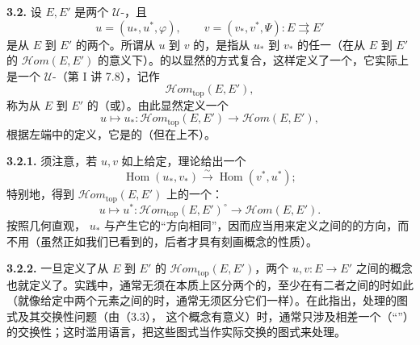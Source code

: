 \textbf{3.2.} 设 $E,E'$ 是两个 $\mathcal U$-，且
\[
 u=(u_*,u^*,\varphi),\qquad v=(v_*,v^*,\Psi):E\rightrightarrows E'
\]
是从 $E$ 到 $E'$ 的两个。所谓从 $u$ 到 $v$ 的，是指从 $u_*$ 到 $v_*$ 的任一（在从 $E$ 到 $E'$ 的 $\mathscr Hom(E,E')$ 的意义下）。的以显然的方式复合，这样定义了一个，它实际上是一个 $\mathcal U$-（第 I 讲 7.8），记作
\[
 \mathscr Hom_{\mathrm{top}}(E,E'),
\]
称为从 $E$ 到 $E'$ 的（或）。由此显然定义一个
\[
 u\longmapsto u_*:\mathscr Hom_{\mathrm{top}}(E,E')\longrightarrow\mathscr Hom(E,E'),
\]
根据左端中的定义，它是的（但在上不）。

\textbf{3.2.1.} 须注意，若 $u,v$ 如上给定，理论给出一个
\[
 \operatorname{Hom}(u_*,v_*)\xrightarrow{\sim}\operatorname{Hom}(v^*,u^*);
\]
特别地，得到 $\mathscr Hom_{\mathrm{top}}(E,E')$ 上的一个：
\[
 u\longmapsto u^*:\mathscr Hom_{\mathrm{top}}(E,E')^\circ\longrightarrow\mathscr Hom(E,E').
\]
按照几何直观， $u_*$ 与产生它的“方向相同”，因而应当用来定义之间的的方向，而不用（虽然正如我们已看到的，后者才具有刻画概念的性质）。

\textbf{3.2.2.} 一旦定义了从 $E$ 到 $E'$ 的 $\mathscr Hom_{\mathrm{top}}(E,E')$，两个 $u,v:E\to E'$ 之间的概念也就定义了。实践中，通常无须在本质上区分两个的，至少在有二者之间的时如此（就像给定中两个元素之间的时，通常无须区分它们一样）。在此指出，处理的图式及其交换性问题（由（3.3），
这个概念有意义）时，通常只涉及相差一个（“”）的交换性；这时滥用语言，把这些图式当作实际交换的图式来处理。

